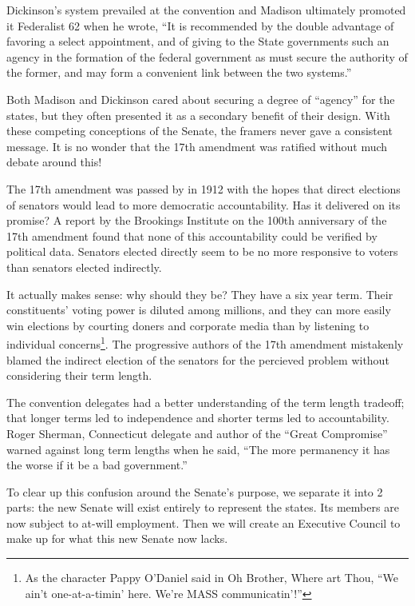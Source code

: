 \documentclass{article}
\newcommand{\quotes}[1]{``#1''}
\begin{document}
Dickinson's system prevailed at the convention and Madison ultimately promoted it Federalist 62 when he wrote, \quotes{It is recommended by the double advantage of favoring a select appointment, and of giving to the State governments such an agency in the formation of the federal government as must secure the authority of the former, and may form a convenient link between the two systems.}\cite{Federalist62}

Both Madison and Dickinson cared about securing a degree of \quotes{agency} for the states, but they often presented it as a secondary benefit of their design. With these competing conceptions of the Senate, the framers never gave a consistent message. It is no wonder that the 17th amendment was ratified without much debate around this!

The 17th amendment was passed by in 1912 with the hopes that direct elections of senators would lead to more democratic accountability\cite{Eisinger}. Has it delivered on its promise? A report by the Brookings Institute on the 100th anniversary of the 17th amendment found that none of this accountability could be verified by political data\cite{Schiller}. Senators elected directly seem to be no more responsive to voters than senators elected indirectly.

It actually makes sense: why should they be? They have a six year term. Their constituents' voting power is diluted among millions, and they can more easily win elections by courting doners and corporate media than by listening to individual concerns\footnote{As the character Pappy O'Daniel said in Oh Brother, Where art Thou, \quotes{We ain't one-at-a-timin' here. We're MASS communicatin'!}}. The progressive authors of the 17th amendment mistakenly blamed the indirect election of the senators for the percieved problem without considering their term length.

The convention delegates had a better understanding of the term length tradeoff; that longer terms led to independence and shorter terms led to accountability. Roger Sherman, Connecticut delegate and author of the \quotes{Great Compromise} warned against long term lengths when he said, \quotes{The more permanency it has the worse if it be a bad government.}\cite{Madison}

To clear up this confusion around the Senate's purpose, we separate it into 2 parts: the new Senate will exist entirely to represent the states. Its members are now subject to at-will employment. Then we will create an Executive Council to make up for what this new Senate now lacks.
\end{document}
